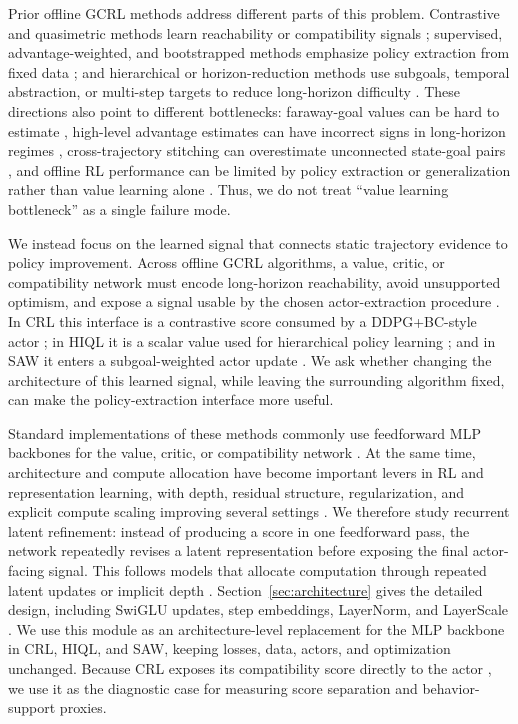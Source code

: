 \documentclass{article}
\begin{document}
Prior offline GCRL methods address different parts of this problem. Contrastive and quasimetric methods learn reachability or compatibility signals \citep{crl, qrl, cgcivl}; supervised, advantage-weighted, and bootstrapped methods emphasize policy extraction from fixed data \citep{wgcsL, gofar, dawog, saw}; and hierarchical or horizon-reduction methods use subgoals, temporal abstraction, or multi-step targets to reduce long-horizon difficulty \citep{hiql, ota, horizon_reduction}. These directions also point to different bottlenecks: faraway-goal values can be hard to estimate \citep{hiql}, high-level advantage estimates can have incorrect signs in long-horizon regimes \citep{ota}, cross-trajectory stitching can overestimate unconnected state-goal pairs \citep{cgcivl}, and offline RL performance can be limited by policy extraction or generalization rather than value learning alone \citep{value_bottleneck}. Thus, we do not treat ``value learning bottleneck'' as a single failure mode.

We instead focus on the learned signal that connects static trajectory evidence to policy improvement. Across offline GCRL algorithms, a value, critic, or compatibility network must encode long-horizon reachability, avoid unsupported optimism, and expose a signal usable by the chosen actor-extraction procedure \citep{ogbench, value_bottleneck}. In CRL this interface is a contrastive score consumed by a DDPG+BC-style actor \citep{crl, td3bc}; in HIQL it is a scalar value used for hierarchical policy learning \citep{hiql}; and in SAW it enters a subgoal-weighted actor update \citep{saw}. We ask whether changing the architecture of this learned signal, while leaving the surrounding algorithm fixed, can make the policy-extraction interface more useful.

Standard implementations of these methods commonly use feedforward MLP backbones for the value, critic, or compatibility network \citep{crl, hiql, ogbench, saw}. At the same time, architecture and compute allocation have become important levers in RL and representation learning, with depth, residual structure, regularization, and explicit compute scaling improving several settings \citep{resnet, d2rl, dr3, bro, simba, thousand_layers}. We therefore study recurrent latent refinement: instead of producing a score in one feedforward pass, the network repeatedly revises a latent representation before exposing the final actor-facing signal. This follows models that allocate computation through repeated latent updates or implicit depth \citep{universal_transformer, act, deq, recurrent_relational_networks, energy_diffusion, hrm, trm, urm}. Section~\ref{sec:architecture} gives the detailed design, including SwiGLU updates, step embeddings, LayerNorm, and LayerScale \citep{shazeer_glu, universal_transformer, layer_norm, layerscale}. We use this module as an architecture-level replacement for the MLP backbone in CRL, HIQL, and SAW, keeping losses, data, actors, and optimization unchanged. Because CRL exposes its compatibility score directly to the actor \citep{crl}, we use it as the diagnostic case for measuring score separation and behavior-support proxies.
\end{document}
